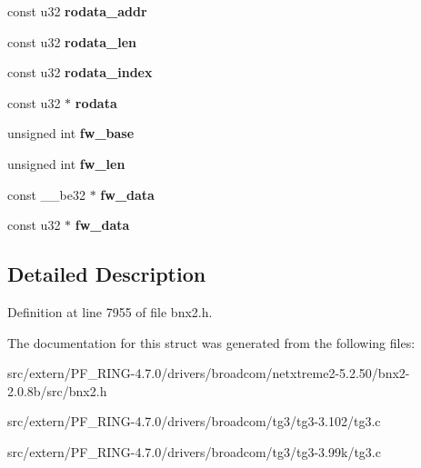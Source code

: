 \begin{DoxyCompactItemize}
\item 
\hypertarget{structfw__info_a7353d1e5cf051dc948994aa832919516}{
const u32 {\bfseries rodata\_\-addr}}
\label{structfw__info_a7353d1e5cf051dc948994aa832919516}

\item 
\hypertarget{structfw__info_af5319147c12cd62c263f926f1dbe171f}{
const u32 {\bfseries rodata\_\-len}}
\label{structfw__info_af5319147c12cd62c263f926f1dbe171f}

\item 
\hypertarget{structfw__info_a5845a58f4db1af775f61b1bebec6a98f}{
const u32 {\bfseries rodata\_\-index}}
\label{structfw__info_a5845a58f4db1af775f61b1bebec6a98f}

\item 
\hypertarget{structfw__info_a7f8f1db5418b13c3d7687062bbbe11d0}{
const u32 $\ast$ {\bfseries rodata}}
\label{structfw__info_a7f8f1db5418b13c3d7687062bbbe11d0}

\item 
\hypertarget{structfw__info_a94cbcb89db292f1af3085b2be30ec990}{
unsigned int {\bfseries fw\_\-base}}
\label{structfw__info_a94cbcb89db292f1af3085b2be30ec990}

\item 
\hypertarget{structfw__info_a5521b97fb08f3a3879c96f483ce9b789}{
unsigned int {\bfseries fw\_\-len}}
\label{structfw__info_a5521b97fb08f3a3879c96f483ce9b789}

\item 
\hypertarget{structfw__info_ac4837571789bcfb069dd4fcf3257fcc2}{
const \_\-\_\-be32 $\ast$ {\bfseries fw\_\-data}}
\label{structfw__info_ac4837571789bcfb069dd4fcf3257fcc2}

\item 
\hypertarget{structfw__info_a618e795028948f9bc69c35a1790a1a27}{
const u32 $\ast$ {\bfseries fw\_\-data}}
\label{structfw__info_a618e795028948f9bc69c35a1790a1a27}

\end{DoxyCompactItemize}


\subsection{Detailed Description}


Definition at line 7955 of file bnx2.h.



The documentation for this struct was generated from the following files:\begin{DoxyCompactItemize}
\item 
src/extern/PF\_\-RING-\/4.7.0/drivers/broadcom/netxtreme2-\/5.2.50/bnx2-\/2.0.8b/src/bnx2.h\item 
src/extern/PF\_\-RING-\/4.7.0/drivers/broadcom/tg3/tg3-\/3.102/tg3.c\item 
src/extern/PF\_\-RING-\/4.7.0/drivers/broadcom/tg3/tg3-\/3.99k/tg3.c\end{DoxyCompactItemize}
